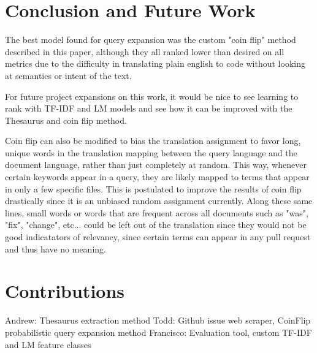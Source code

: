 \documentclass[10pt,a4paper]{article}
\begin{document}
\section{Conclusion and Future Work}

The best model found for query expansion was the custom "coin flip" method described in
this paper, although they all ranked lower than desired on all metrics due to the difficulty
in translating plain english to code without looking at semantics or intent of the text.

For future project expansions on this work, it would be nice to see learning to
rank with TF-IDF and LM models and see how it can be improved with the Thesaurus
and coin flip method.

Coin flip can also be modified to bias the translation assignment to favor
long, unique words in the translation mapping between the query language and the
document language, rather than just completely at random. This way, whenever
certain keywords appear in a query, they are likely mapped to terms that appear
in only a few specific files. This is postulated to improve the results of coin
flip drastically since it is an unbiased random assignment currently. Along
these same lines, small words or words that are frequent across all documents
such as "was", "fix", "change", etc... could be left out of the translation
since they would not be good indicatators of relevancy, since certain terms can
appear in any pull request and thus have no meaning.

\section{Contributions}

Andrew: Thesaurus extraction method
Todd: Github issue web scraper, CoinFlip probabilistic query expansion method
Francisco: Evaluation tool, custom TF-IDF and LM feature classes
\end{document}
